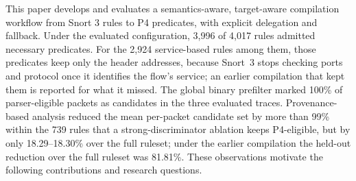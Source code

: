 \documentclass{article}
\begin{document}
This paper develops and evaluates a semantics-aware, target-aware compilation
workflow from Snort 3 rules to P4 predicates, with explicit delegation and
fallback. Under the evaluated configuration, 3,996 of 4,017 rules admitted
necessary predicates. For the 2,924 service-based rules among them, those
predicates keep only the header addresses, because Snort~3 stops checking
ports and protocol once it identifies the flow's service; an earlier
compilation that kept them is reported for what it missed. The global
binary prefilter marked 100\% of parser-eligible packets as candidates in
the three evaluated traces. Provenance-based analysis reduced the mean
per-packet candidate set by more than 99\% within the 739 rules that a
strong-discriminator ablation keeps P4-eligible, but by only 18.29--18.30\%
over the full ruleset; under the earlier compilation the held-out reduction
over the full ruleset was 81.81\%. These
observations motivate the following contributions and research questions.
\end{document}
